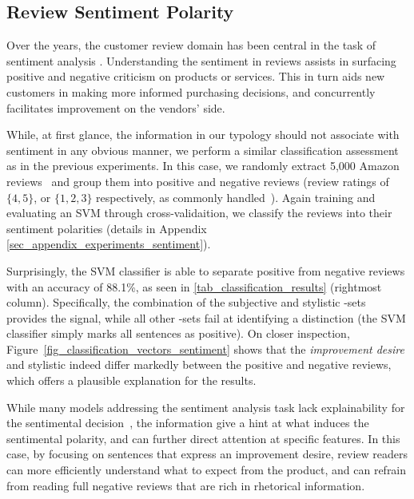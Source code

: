 \subsection{Review Sentiment Polarity}
\label{sec_experiments_sentiment}

Over the years, the customer review domain has been central in the task of sentiment analysis \citep{chen2017sentAnaWithTypeClassification, Tesfagergish2022zeroshot_classification}. Understanding the sentiment in reviews assists in surfacing positive and negative criticism on products or services. This in turn aids new customers in making more informed purchasing decisions, and concurrently facilitates improvement on the vendors' side.

While, at first glance, the information \taxtypes{} in our typology should not associate with sentiment in any obvious manner, we perform a similar classification assessment as in the previous experiments.
In this case, we randomly extract 5,000 Amazon reviews~\citep{he2016reviewsDS} and group them into positive and negative reviews (review ratings of $\{4,5\}$, or $\{1,2,3\}$ respectively, as commonly handled~\citep{Shivaprasad2017SentAnaRev}).
Again training and evaluating an SVM through cross-validaition, we classify the reviews into their sentiment polarities (details in Appendix \ref{sec_appendix_experiments_sentiment}).

Surprisingly, the SVM classifier is able to separate positive from negative reviews with an accuracy of 88.1\%, as seen in \autoref{tab_classification_results} (rightmost column).
Specifically, the combination of the subjective and stylistic \taxtype{}-sets provides the signal, while all other \taxtype{}-sets fail at identifying a distinction (the SVM classifier simply marks all sentences as positive). On closer inspection, Figure~\ref{fig_classification_vectors_sentiment} shows that the \textit{improvement desire} and stylistic \taxtypes{} indeed differ markedly between the positive and negative reviews, which offers a plausible explanation for the results.

While many models addressing the sentiment analysis task lack explainability for the sentimental decision~\citep{Adak2022sentimentExplainability}, the information \taxtypes{} give a hint at what induces the sentimental polarity, and can further direct attention at specific features. In this case, by focusing on sentences that express an improvement desire, review readers can more efficiently understand what to expect from the product, and can refrain from reading full negative reviews that are rich in rhetorical information.

